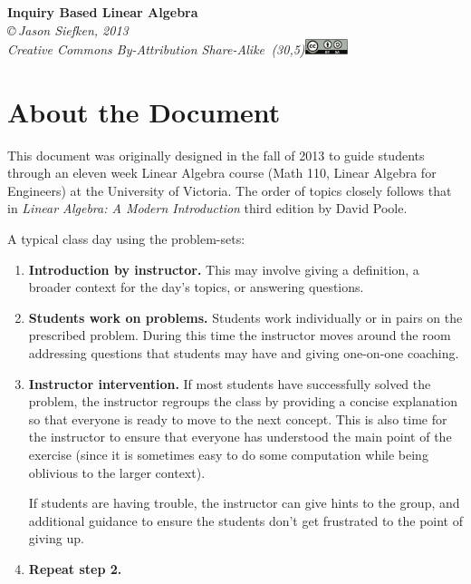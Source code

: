 \documentclass[letter]{article}
\begin{document}
\pagestyle{empty}

\begin{center}
{\huge\bf Inquiry Based Linear Algebra}\\

\vspace{.7in}
{
\it \copyright\,Jason Siefken, 2013 \\
Creative Commons By-Attribution Share-Alike\, \makebox(30,5){\includegraphics[height=1.2em]{by-sa.pdf}}
}
\end{center}

\section*{About the Document}
This document was originally designed in the fall of 2013 to guide students
through an eleven week Linear Algebra course (Math 110, Linear Algebra for Engineers) at
the University of Victoria.  The order of topics closely follows that in {\it Linear
Algebra: A Modern Introduction} third edition by David Poole.

A typical class day using the problem-sets:
\begin{enumerate}
	\item {\bf Introduction by instructor.} This may involve giving a definition,
		a broader context for the day's topics, or answering questions.
	\item {\bf Students work on problems.} Students work individually or in pairs
		on the prescribed problem.  During this time the instructor moves around
		the room addressing questions that students may have and giving one-on-one
		coaching.
	\item {\bf Instructor intervention.} If most students have successfully solved the 
		problem, the instructor regroups the class by providing a concise 
		explanation so that everyone is ready to move to the next concept.  This
		is also time for the instructor to ensure that everyone has understood the
		main point of the exercise (since it is sometimes easy to do some computation
		while being oblivious to the larger context).

		If students are having trouble, the instructor can give hints to the group,
		and additional guidance to ensure the students don't get frustrated
		to the point of giving up.
	\item {\bf Repeat step 2.}
\end{enumerate}
\end{document}
